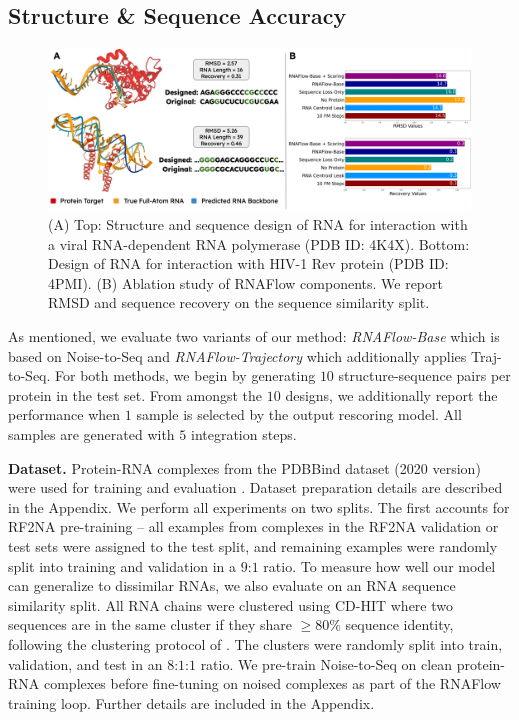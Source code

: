 \subsection{Structure \& Sequence Accuracy}
\label{sec:exp1}

\begin{figure}[ht]
    \centering
    \includegraphics[width=2\columnwidth]{fig3ab_updated.png}
    \caption{(A) Top: Structure and sequence design of RNA for interaction with a viral RNA-dependent RNA polymerase (PDB ID: 4K4X). Bottom: Design of RNA for interaction with HIV-1 Rev protein (PDB ID: 4PMI). (B) Ablation study of RNAFlow components. We report RMSD and sequence recovery on the sequence similarity split.}
    \label{fig:3}
\end{figure}

As mentioned, we evaluate two variants of our method: \textit{RNAFlow-Base} which is based on Noise-to-Seq and \textit{RNAFlow-Trajectory} which additionally applies Traj-to-Seq. For both methods, we begin by generating $10$ structure-sequence pairs per protein in the test set. From amongst the $10$ designs, we additionally report the performance when $1$ sample is selected by the output rescoring model. All samples are generated with $5$ integration steps.

\textbf{Dataset.} Protein-RNA complexes from the PDBBind dataset (2020 version) were used for training and evaluation \cite{liu2017forging}. Dataset preparation details are described in the Appendix. We perform all experiments on two splits. The first accounts for RF2NA pre-training -- all examples from complexes in the RF2NA validation or test sets were assigned to the test split, and remaining examples were randomly split into training and validation in a $9$:$1$ ratio. To measure how well our model can generalize to dissimilar RNAs, we also evaluate on an RNA sequence similarity split. All RNA chains were clustered using CD-HIT \cite{fu2012cd} where two sequences are in the same cluster if they share $\geq 80\%$ sequence identity, following the clustering protocol of \citet{joshi2023multi}. The clusters were randomly split into train, validation, and test in an $8$:$1$:$1$ ratio. We pre-train Noise-to-Seq on clean protein-RNA complexes before fine-tuning on noised complexes as part of the RNAFlow training loop. Further details are included in the Appendix.

